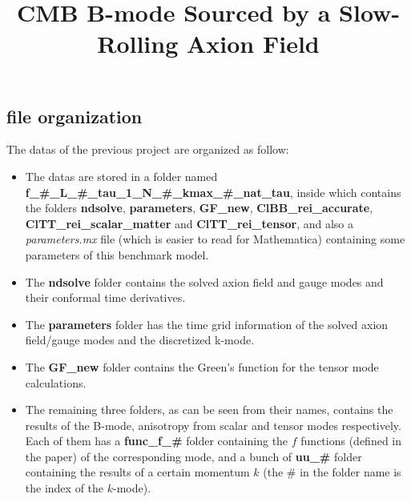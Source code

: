 \documentclass[12pt]{article}
\title{\vspace{-1.5cm}CMB B-mode Sourced by a Slow-Rolling Axion Field}
\date{}
\newcommand{\bv}[1]{{\bf #1}}
\begin{document}

\subsection*{file organization}
The datas of the previous project are organized as follow:
\begin{itemize}\itemsep0em
\item The datas are stored in a folder named \bv{f\_\#\_L\_\#\_tau\_1\_N\_\#\_kmax\_\#\_nat\_tau}, inside which contains the folders \bv{ndsolve}, \bv{parameters}, \bv{GF\_new}, \bv{ClBB\_rei\_accurate}, \bv{ClTT\_rei\_scalar\_matter} and \bv{ClTT\_rei\_tensor}, and also a \textit{parameters.mx} file (which is easier to read for Mathematica) containing some parameters of this benchmark model.
\item The \bv{ndsolve} folder contains the solved axion field and gauge modes and their conformal time derivatives.
\item The \bv{parameters} folder has the time grid information of the solved axion field/gauge modes and the discretized k-mode.
\item The \bv{GF\_new} folder contains the Green's function for the tensor mode calculations.
\item The remaining three folders, as can be seen from their names, contains the results of the B-mode, anisotropy from scalar and tensor modes respectively. Each of them has a \bv{func\_f\_\#} folder containing the $f$ functions (defined in the paper) of the corresponding mode, and a bunch of \bv{uu\_\#} folder containing the results of a certain momentum $k$ (the \# in the folder name is the index of the $k$-mode).
\end{itemize}
\end{document}

